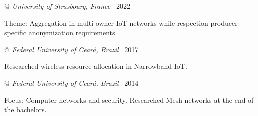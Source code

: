 
 @ \textit{University of Strasbourg, France}
\dotfill {} \textemdash\ 2022

{\small \enspace Theme: Aggregation in multi-owner IoT networks while respection producer-specific anonymization requirements}


\smallskip


 @ \textit{Federal University of Ceará, Brazil}
\dotfill {} \textemdash\ 2017

{\small \enspace Researched wireless resource allocation in Narrowband IoT.}


\smallskip


 @ \textit{Federal University of Ceará, Brazil}
\dotfill {} \textemdash\ 2014

{\small \enspace Focus: Computer networks and security. Researched Mesh networks at the end of the bachelors.}
